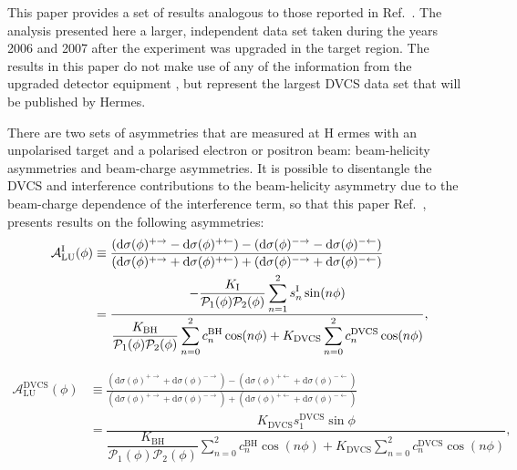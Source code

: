 This paper provides a set of results analogous to those reported in
Ref.~\cite{Air09}. The analysis presented here  a larger, independent data set taken during the years 2006 and 2007 after the experiment was upgraded in the target region. 
The results in this paper do not make use of any of the information from the
upgraded detector equipment , but represent the largest DVCS data set that will
be published by H{\sc ermes}. 

There are two sets of asymmetries that are measured at H{\sc
ermes} with an unpolarised target and a polarised electron or positron beam:
beam-helicity asymmetries and beam-charge asymmetries. It is possible to
disentangle the DVCS and interference contributions to the beam-helicity
asymmetry due to the beam-charge dependence of the interference term, so that
this paper  Ref.~\cite{Air09}\blue{)}, presents results on the following asymmetries:
\begin{align}
\hspace{0.5cm}\mathcal{A}^{\textrm{I}}_{\textrm{LU}}(\phi) &\equiv
\frac{(\textrm{d}\sigma(\phi)^{+\rightarrow} -
\textrm{d}\sigma(\phi)^{+\leftarrow}) -
(\textrm{d}\sigma(\phi)^{-\rightarrow}
- \textrm{d}\sigma(\phi)^{-\leftarrow})}{(\textrm{d}\sigma(\phi)^{+\rightarrow}
+
\textrm{d}\sigma(\phi)^{+\leftarrow}) +
(\textrm{d}\sigma(\phi)^{-\rightarrow}
+ \textrm{d}\sigma(\phi)^{-\leftarrow})}&  \nonumber \\
&=\dfrac{-\dfrac{K_{\textrm{I}}}{\mathcal{P}_{1}(\phi)\mathcal{P}_{2}(\phi)}
\displaystyle\sum_{n=1}^2
s_{n}^{\textrm{I}}\sin(n\phi)}{\dfrac{K_{\textrm{BH}}}{\mathcal{P}_{1}
(\phi)\mathcal{P}_{
2}(\phi)}
\displaystyle\sum_{n=0}^2
c_{n}^{\textrm{BH}}\cos(n\phi) + 
K_{\textrm{DVCS}}\displaystyle\sum_{n=0}^2 c_{n}^{\textrm{DVCS}}\cos(n\phi)},& 
\label{e:alui}
\end{align}

\begin{align}
\mathcal{A}^{\textrm{DVCS}}_{\textrm{LU}}(\phi) &\equiv
\frac{(\textrm{d}\sigma(\phi)^{+\rightarrow} +
\textrm{d}\sigma(\phi)^{-\rightarrow}) -
(\textrm{d}\sigma(\phi)^{+\leftarrow} + 
\textrm{d}\sigma(\phi)^{-\leftarrow})}
{(\textrm{d}\sigma(\phi)^{+\rightarrow} +
\textrm{d}\sigma(\phi)^{-\rightarrow}) +
(\textrm{d}\sigma(\phi)^{+\leftarrow}
+ \textrm{d}\sigma(\phi)^{-\leftarrow})}&  \nonumber \\
&=\dfrac{K_{\textrm{DVCS}}
s_{1}^{\textrm{DVCS}}\sin\phi}{\dfrac{K_{\textrm{BH}}}{\mathcal{P}_{1}
(\phi)\mathcal{P}_{2}(\phi)}
\displaystyle\sum_{n=0}^2
c_{n}^{\textrm{BH}}\cos(n\phi) + 
K_{\textrm{DVCS}}\displaystyle\sum_{n=0}^2 c_{n}^{\textrm{DVCS}}\cos(n\phi)},&
\label{e:aludvcs}
\end{align}

